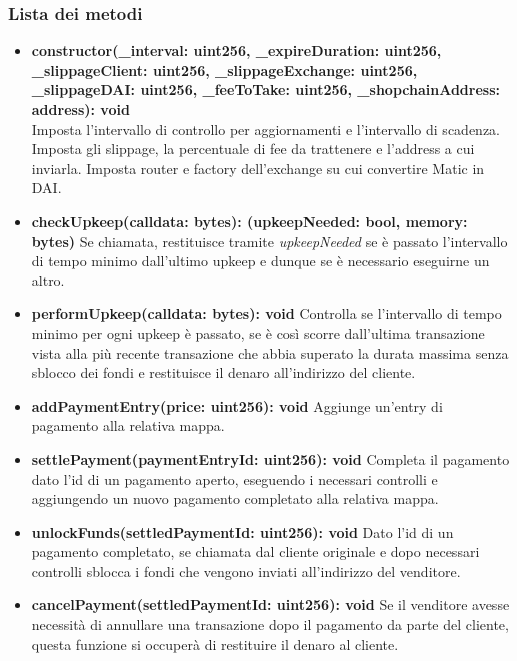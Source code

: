 \documentclass[a4paper, 12pt]{article}
\begin{document}
\subsubsection{Lista dei metodi}
\begin{itemize}
    \item \textbf{constructor(\_interval: uint256, \_expireDuration: uint256, \_slippageClient: uint256, \_slippageExchange: uint256, \_slippageDAI: uint256, \_feeToTake: uint256, \_shopchainAddress: address): void}
    \\Imposta l'intervallo di controllo per aggiornamenti e l'intervallo di scadenza.
    Imposta gli slippage, la percentuale di fee da trattenere e l'address a cui inviarla.
    Imposta router e factory dell'exchange su cui convertire Matic in DAI.\\
    \item \textbf{checkUpkeep(calldata: bytes): (upkeepNeeded: bool, memory: bytes)}
    Se chiamata, restituisce tramite \textit{upkeepNeeded} se è passato l'intervallo di tempo minimo dall'ultimo upkeep e dunque se è necessario eseguirne un altro.\\
    \item \textbf{performUpkeep(calldata: bytes): void}
    Controlla se l'intervallo di tempo minimo per ogni upkeep è passato, se è così scorre dall'ultima transazione vista alla più recente transazione che abbia superato la durata massima senza sblocco dei fondi
    e restituisce il denaro all'indirizzo del cliente.\\
    \item \textbf{addPaymentEntry(price: uint256): void}
    Aggiunge un'entry di pagamento alla relativa mappa.\\
    \item \textbf{settlePayment(paymentEntryId: uint256): void}
    Completa il pagamento dato l'id di un pagamento aperto, eseguendo i necessari controlli e aggiungendo un nuovo pagamento completato alla relativa mappa.\\
    \item \textbf{unlockFunds(settledPaymentId: uint256): void}
    Dato l'id di un pagamento completato, se chiamata dal cliente originale e dopo necessari controlli sblocca i fondi che vengono inviati all'indirizzo del venditore.\\
    \item \textbf{cancelPayment(settledPaymentId: uint256): void}
    Se il venditore avesse necessità di annullare una transazione dopo il pagamento da parte del cliente, questa funzione si occuperà di restituire il denaro al cliente.\\

\end{itemize}
\end{document}
